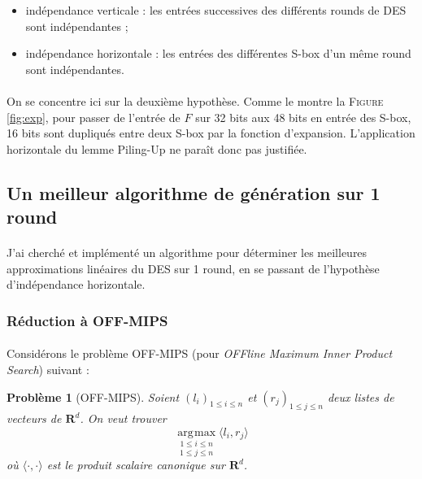 \documentclass{scrartcl}
\DeclareMathOperator*{\argmax}{\arg\!\max}
\newtheorem*{Prob}{Problème}
\begin{document}
\begin{itemize}
	\item indépendance verticale : les entrées successives des différents rounds de DES sont indépendantes ; 
	\item indépendance horizontale : les entrées des différentes S-box d'un même round sont indépendantes. 
\end{itemize}

\paragraph*{}
On se concentre ici sur la deuxième hypothèse. Comme le montre la \textsc{Figure} \ref{fig:exp}, pour passer de l'entrée de $F$ sur 32 bits aux
48 bits en entrée des S-box, 16 bits sont dupliqués entre deux S-box par la fonction d'expansion. L'application horizontale
du lemme Piling-Up ne paraît donc pas justifiée.

\subsection{Un meilleur algorithme de génération sur 1 round}

\paragraph*{}
J'ai cherché et implémenté un algorithme pour déterminer les meilleures approximations linéaires du DES sur 1 round, en se
passant de l'hypothèse d'indépendance horizontale.

\subsubsection{Réduction à OFF-MIPS}

\paragraph*{}
Considérons le problème OFF-MIPS (pour \textit{OFFline Maximum Inner Product Search}) suivant :

\begin{Prob}[OFF-MIPS]
Soient $(l_i)_{1\le i\le n}$ et $(r_j)_{1\le j\le n}$ deux listes de vecteurs de $\mathbf{R}^d$. On veut trouver
	$$\underset{1\le j\le n}{\underset{1\le i\le n}{\argmax}}\langle l_i,r_j\rangle$$
où $\langle\cdot,\cdot\rangle$ est le produit scalaire canonique sur $\mathbf{R}^d$.
\end{Prob}
\end{document}
